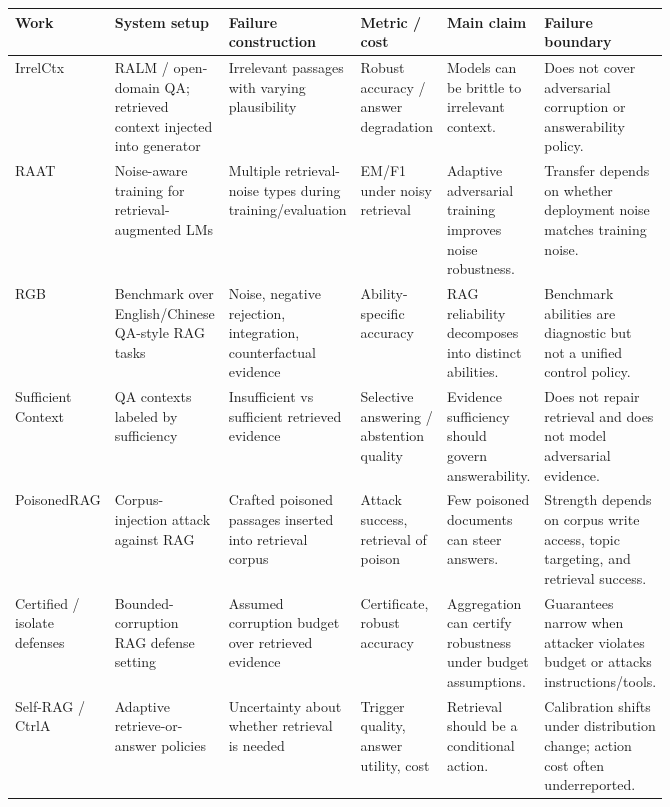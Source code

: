 \begin{table}[t]
\centering
\scriptsize
\renewcommand{\arraystretch}{0.86}
\begin{tabularx}{\linewidth}{>{\raggedright\arraybackslash}p{0.13\linewidth}>{\raggedright\arraybackslash}p{0.17\linewidth}>{\raggedright\arraybackslash}p{0.17\linewidth}>{\raggedright\arraybackslash}p{0.16\linewidth}>{\raggedright\arraybackslash}p{0.13\linewidth}X}
\toprule
\textbf{Work} & \textbf{System setup} & \textbf{Failure construction} & \textbf{Metric / cost} & \textbf{Main claim} & \textbf{Failure boundary} \\
\midrule
IrrelCtx & RALM / open-domain QA; retrieved context injected into generator & Irrelevant passages with varying plausibility & Robust accuracy / answer degradation & Models can be brittle to irrelevant context. & Does not cover adversarial corruption or answerability policy. \\
RAAT & Noise-aware training for retrieval-augmented LMs & Multiple retrieval-noise types during training/evaluation & EM/F1 under noisy retrieval & Adaptive adversarial training improves noise robustness. & Transfer depends on whether deployment noise matches training noise. \\
RGB & Benchmark over English/Chinese QA-style RAG tasks & Noise, negative rejection, integration, counterfactual evidence & Ability-specific accuracy & RAG reliability decomposes into distinct abilities. & Benchmark abilities are diagnostic but not a unified control policy. \\
Sufficient Context & QA contexts labeled by sufficiency & Insufficient vs sufficient retrieved evidence & Selective answering / abstention quality & Evidence sufficiency should govern answerability. & Does not repair retrieval and does not model adversarial evidence. \\
PoisonedRAG & Corpus-injection attack against RAG & Crafted poisoned passages inserted into retrieval corpus & Attack success, retrieval of poison & Few poisoned documents can steer answers. & Strength depends on corpus write access, topic targeting, and retrieval success. \\
Certified / isolate defenses & Bounded-corruption RAG defense setting & Assumed corruption budget over retrieved evidence & Certificate, robust accuracy & Aggregation can certify robustness under budget assumptions. & Guarantees narrow when attacker violates budget or attacks instructions/tools. \\
Self-RAG / CtrlA & Adaptive retrieve-or-answer policies & Uncertainty about whether retrieval is needed & Trigger quality, answer utility, cost & Retrieval should be a conditional action. & Calibration shifts under distribution change; action cost often underreported. \\

\end{tabularx}
\end{table}
